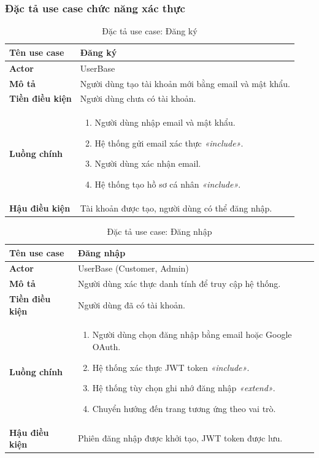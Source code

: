 \subsubsection{Đặc tả use case chức năng xác thực}

\begin{table}[H]
\centering
\caption{Đặc tả use case: Đăng ký}
\begin{tabularx}{\textwidth}{|l|X|}
\hline
\textbf{Tên use case} & Đăng ký \\
\hline
\textbf{Actor} & UserBase \\
\hline
\textbf{Mô tả} & Người dùng tạo tài khoản mới bằng email và mật khẩu. \\
\hline
\textbf{Tiền điều kiện} & Người dùng chưa có tài khoản. \\
\hline
\textbf{Luồng chính} &
\begin{enumerate}[noitemsep,topsep=0pt]
    \item Người dùng nhập email và mật khẩu.
    \item Hệ thống gửi email xác thực \textit{«include»}.
    \item Người dùng xác nhận email.
    \item Hệ thống tạo hồ sơ cá nhân \textit{«include»}.
\end{enumerate} \\
\hline
\textbf{Hậu điều kiện} & Tài khoản được tạo, người dùng có thể đăng nhập. \\
\hline
\end{tabularx}
\end{table}

\begin{table}[H]
\centering
\caption{Đặc tả use case: Đăng nhập}
\begin{tabularx}{\textwidth}{|l|X|}
\hline
\textbf{Tên use case} & Đăng nhập \\
\hline
\textbf{Actor} & UserBase (Customer, Admin) \\
\hline
\textbf{Mô tả} & Người dùng xác thực danh tính để truy cập hệ thống. \\
\hline
\textbf{Tiền điều kiện} & Người dùng đã có tài khoản. \\
\hline
\textbf{Luồng chính} &
\begin{enumerate}[noitemsep,topsep=0pt]
    \item Người dùng chọn đăng nhập bằng email hoặc Google OAuth.
    \item Hệ thống xác thực JWT token \textit{«include»}.
    \item Hệ thống tùy chọn ghi nhớ đăng nhập \textit{«extend»}.
    \item Chuyển hướng đến trang tương ứng theo vai trò.
\end{enumerate} \\
\hline
\textbf{Hậu điều kiện} & Phiên đăng nhập được khởi tạo, JWT token được lưu. \\
\hline
\end{tabularx}
\end{table}

